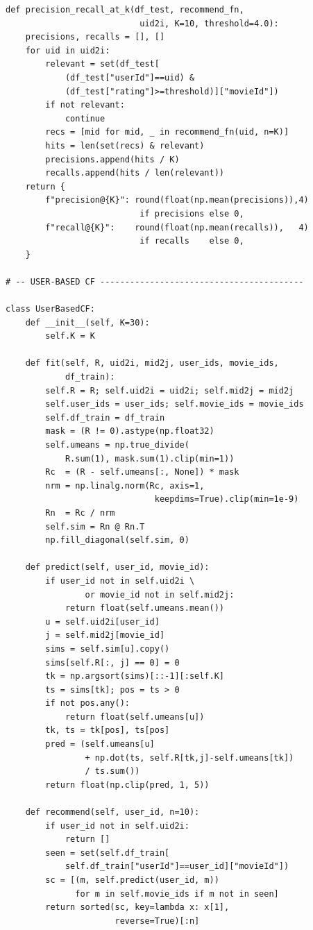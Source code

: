 ﻿\documentclass[../BTL.tex]{subfiles}
\begin{document}
\begin{lstlisting}[style=python,
    caption={models.py -- User-based CF / Item-based CF /
              Matrix Factorization / RecommendationSystem facade}]
def precision_recall_at_k(df_test, recommend_fn,
                           uid2i, K=10, threshold=4.0):
    precisions, recalls = [], []
    for uid in uid2i:
        relevant = set(df_test[
            (df_test["userId"]==uid) &
            (df_test["rating"]>=threshold)]["movieId"])
        if not relevant:
            continue
        recs = [mid for mid, _ in recommend_fn(uid, n=K)]
        hits = len(set(recs) & relevant)
        precisions.append(hits / K)
        recalls.append(hits / len(relevant))
    return {
        f"precision@{K}": round(float(np.mean(precisions)),4)
                           if precisions else 0,
        f"recall@{K}":    round(float(np.mean(recalls)),   4)
                           if recalls    else 0,
    }

# -- USER-BASED CF -----------------------------------------

class UserBasedCF:
    def __init__(self, K=30):
        self.K = K

    def fit(self, R, uid2i, mid2j, user_ids, movie_ids,
            df_train):
        self.R = R; self.uid2i = uid2i; self.mid2j = mid2j
        self.user_ids = user_ids; self.movie_ids = movie_ids
        self.df_train = df_train
        mask = (R != 0).astype(np.float32)
        self.umeans = np.true_divide(
            R.sum(1), mask.sum(1).clip(min=1))
        Rc  = (R - self.umeans[:, None]) * mask
        nrm = np.linalg.norm(Rc, axis=1,
                              keepdims=True).clip(min=1e-9)
        Rn  = Rc / nrm
        self.sim = Rn @ Rn.T
        np.fill_diagonal(self.sim, 0)

    def predict(self, user_id, movie_id):
        if user_id not in self.uid2i \
                or movie_id not in self.mid2j:
            return float(self.umeans.mean())
        u = self.uid2i[user_id]
        j = self.mid2j[movie_id]
        sims = self.sim[u].copy()
        sims[self.R[:, j] == 0] = 0
        tk = np.argsort(sims)[::-1][:self.K]
        ts = sims[tk]; pos = ts > 0
        if not pos.any():
            return float(self.umeans[u])
        tk, ts = tk[pos], ts[pos]
        pred = (self.umeans[u]
                + np.dot(ts, self.R[tk,j]-self.umeans[tk])
                / ts.sum())
        return float(np.clip(pred, 1, 5))

    def recommend(self, user_id, n=10):
        if user_id not in self.uid2i:
            return []
        seen = set(self.df_train[
            self.df_train["userId"]==user_id]["movieId"])
        sc = [(m, self.predict(user_id, m))
              for m in self.movie_ids if m not in seen]
        return sorted(sc, key=lambda x: x[1],
                      reverse=True)[:n]


\end{lstlisting}
\end{document}

